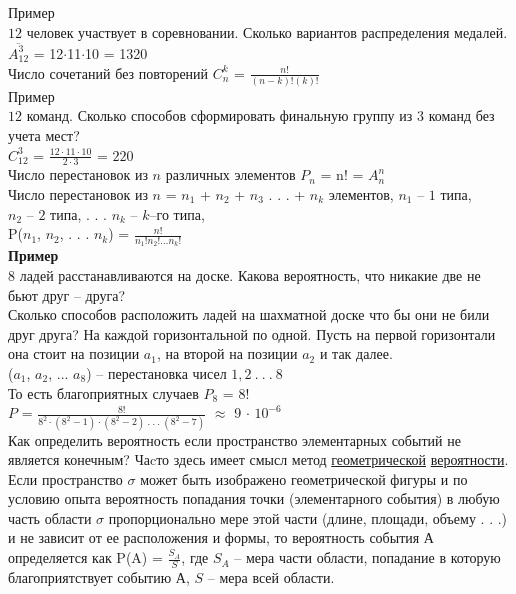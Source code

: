 \documentclass[russian, 12pt, fleqn,x11names]{article}
\begin{document}
$\textbf{Пример}$ \\$12$ человек участвует в соревновании. Сколько вариантов распределения медалей. $\overline{A^3_{12}}$  = 12$\cdot$11$\cdot$10  = 1320\\
Число сочетаний без повторений  $C^k_n$ = $\frac{n!}{(n-k)!(k)!}$\\
$\textbf{Пример}$ \\$12$ команд. Сколько способов сформировать финальную группу из $3$ команд без учета мест?\\
  $C^3_{12}$  = $\frac{ 12\cdot11\cdot 10 }{2\cdot3} $ = $220$\\
Число  перестановок из $n$ различных элементов $P_n$ = n! = ${A^n_n}$\\
Число перестановок из $n$ = $n_1$ + $n_2$ +  $n_3$ . . .  + $n_k$ элементов, $n_1$ -- $1$ типа,\\ $n_2$ -- $2$ типа, . . . $n_k$ -- $k$--го типа,\\
P($n_1$,  $n_2$, . . .  $n_k$) = $\frac{n!}{{n_1}!{n_2}!. . .{n_k}!}$\\
\textbf{Пример}\\ 8 ладей расстанавливаются на доске. Какова вероятность, что никакие две не бьют друг -- друга?\\
Сколько способов расположить ладей на шахматной доске что бы они не били друг друга? На каждой горизонтальной по одной. Пусть  на первой горизонтали она стоит на позиции $a_1$,  на второй на позиции $a_2$ и так далее.\\
($a_1$, $a_2$, ... $a_8$)  -- перестановка чисел $1,2\ .\ .\ .\ $8\\
То есть благоприятных случаев $P_8$ = $8$!\\
$P$ = $\frac{8!}{ 8^2 \cdot (8^2 - 1) \cdot (8^2 - 2)  \ .\ .\ . \   (8^2 - 7)} $  $\approx$   9 $\cdot$  $10^{-6}$\\
Как определить вероятность если пространство элементарных событий не\\ является конечным? Чаcто здесь имеет смысл метод \underline{геометрической} \underline{вероятности}.  Если пространство  $\sigma$ может быть изображено геометрической фигуры и по условию опыта вероятность попадания точки (элементарного события) в любую часть области $\sigma$ пропорционально мере этой части (длине, площади, объему . . .) и не зависит от ее расположения и формы, то вероятность события А определяется как P(A) = $\frac{S_A}{S}$, где $S_A$ -- мера части области, попадание в которую благоприятствует событию $А$, $S$ -- мера всей области.\\
\end{document}
